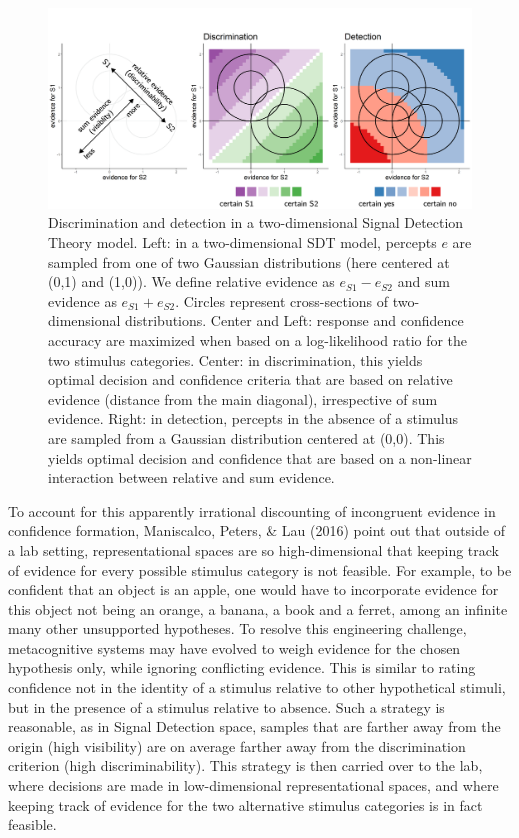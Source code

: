 \documentclass[12pt,twoside]{reedthesis}
\begin{document}
\begin{figure}
\includegraphics[width=\textwidth]{figure/RC/2dmodel_enhanced} \caption[Discrimination and detection in a two-dimensional SDT model]{Discrimination and detection in a two-dimensional Signal Detection Theory model. Left: in a two-dimensional SDT model, percepts \(e\) are sampled from one of two Gaussian distributions (here centered at (0,1) and (1,0)). We define relative evidence as \(e_{S1}-e_{S2}\) and sum evidence as \(e_{S1}+e_{S2}\). Circles represent cross-sections of two-dimensional distributions. Center and Left: response and confidence accuracy are maximized when based on a log-likelihood ratio for the two stimulus categories. Center: in discrimination, this yields optimal decision and confidence criteria that are based on relative evidence (distance from the main diagonal), irrespective of sum evidence. Right: in detection, percepts in the absence of a stimulus are sampled from a Gaussian distribution centered at (0,0). This yields optimal decision and confidence that are based on a non-linear interaction between relative and sum evidence.}\label{fig:RC-2dmodel}
\end{figure}
To account for this apparently irrational discounting of incongruent evidence in confidence formation, Maniscalco, Peters, \& Lau (2016) point out that outside of a lab setting, representational spaces are so high-dimensional that keeping track of evidence for every possible stimulus category is not feasible. For example, to be confident that an object is an apple, one would have to incorporate evidence for this object not being an orange, a banana, a book and a ferret, among an infinite many other unsupported hypotheses. To resolve this engineering challenge, metacognitive systems may have evolved to weigh evidence for the chosen hypothesis only, while ignoring conflicting evidence. This is similar to rating confidence not in the identity of a stimulus relative to other hypothetical stimuli, but in the presence of a stimulus relative to absence. Such a strategy is reasonable, as in Signal Detection space, samples that are farther away from the origin (high visibility) are on average farther away from the discrimination criterion (high discriminability). This strategy is then carried over to the lab, where decisions are made in low-dimensional representational spaces, and where keeping track of evidence for the two alternative stimulus categories is in fact feasible.
\end{document}
